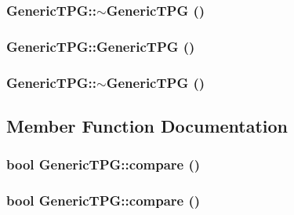 \hypertarget{classGenericTPG_f1c645245af41d6b21eef232ff65587a}{
\subsubsection[{$\sim$GenericTPG}]{\setlength{\rightskip}{0pt plus 5cm}GenericTPG::$\sim$GenericTPG ()}}
\label{classGenericTPG_f1c645245af41d6b21eef232ff65587a}


\hypertarget{classGenericTPG_4caf5cdc5c95a600391ecd2eb2c071fc}{
\subsubsection[{GenericTPG}]{\setlength{\rightskip}{0pt plus 5cm}GenericTPG::GenericTPG ()}}
\label{classGenericTPG_4caf5cdc5c95a600391ecd2eb2c071fc}


\hypertarget{classGenericTPG_f1c645245af41d6b21eef232ff65587a}{
\subsubsection[{$\sim$GenericTPG}]{\setlength{\rightskip}{0pt plus 5cm}GenericTPG::$\sim$GenericTPG ()}}
\label{classGenericTPG_f1c645245af41d6b21eef232ff65587a}




\subsection{Member Function Documentation}
\hypertarget{classGenericTPG_d26b3d9a264ebe07d44b9194626c98d7}{
\subsubsection[{compare}]{\setlength{\rightskip}{0pt plus 5cm}bool GenericTPG::compare ()}}
\label{classGenericTPG_d26b3d9a264ebe07d44b9194626c98d7}


\hypertarget{classGenericTPG_d26b3d9a264ebe07d44b9194626c98d7}{
\subsubsection[{compare}]{\setlength{\rightskip}{0pt plus 5cm}bool GenericTPG::compare ()}}
\label{classGenericTPG_d26b3d9a264ebe07d44b9194626c98d7}


